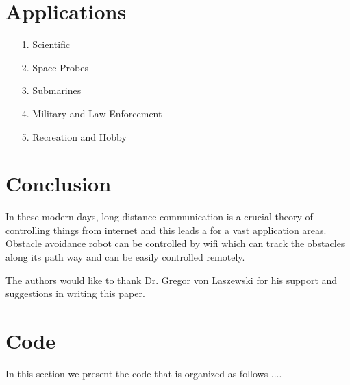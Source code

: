 \documentclass[sigconf]{acmart}
\begin{document}
\section{Applications}
\begin{itemize}
    \item[1.] Scientific
    \item[2.] Space Probes
    \item[3.] Submarines
    \item[4.] Military and Law Enforcement
    \item[5.] Recreation and Hobby
\end{itemize}

\section{Conclusion}
In these modern days, long distance communication is a crucial theory of controlling things from internet and this leads a for a vast application areas. Obstacle avoidance robot can be controlled by wifi which can track the obstacles along its path way and can be easily controlled remotely.

\begin{acks}

The authors would like to thank Dr. Gregor von Laszewski for his support and suggestions in writing this paper.

\end{acks}


 

\appendix

\section{Code}

In this section we present the code that is organized as follows ....

\end{document}
